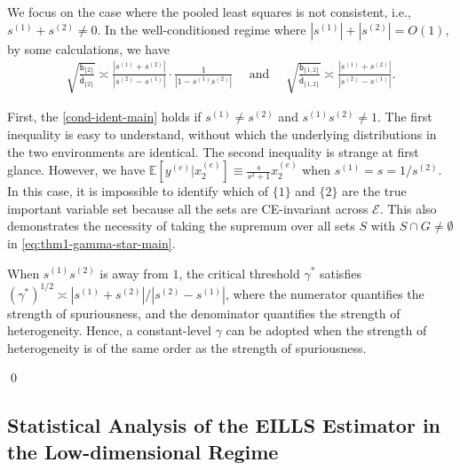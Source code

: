 \documentclass[10pt]{article}
\numberwithin{equation}{section}
\begin{document}
{\begin{example}
{\normalfont We focus on the case where the pooled least squares is not consistent, i.e., $s^{(1)} + s^{(2)} \neq 0$. In the well-conditioned regime where $|s^{(1)}| + |s^{(2)}| = O(1)$, by some calculations, we have
    \begin{align*}
        \sqrt{\frac{\mathsf{b}_{\{2\}}}{\bar{\mathsf{d}}_{\{2\}}}} \asymp \frac{|s^{(1)}+s^{(2)}|}{|s^{(2)} - s^{(1)}|} \cdot \frac{1}{|1 - s^{(1)} s^{(2)}|}~~~~~~\text{and}~~~~~~\sqrt{\frac{\mathsf{b}_{\{1,2\}}}{\bar{\mathsf{d}}_{\{1,2\}}}} \asymp \frac{|s^{(1)} + s^{(2)}|}{|s^{(2)} - s^{(1)}|}.
    \end{align*}

First, the \cref{cond-ident-main} holds if $s^{(1)}\neq s^{(2)}$ and $s^{(1)} s^{(2)} \neq 1$. The first inequality is easy to understand, without which the underlying distributions in the two environments are identical. The second inequality is strange at first glance. However, we have $\mathbb{E}[y^{(e)}|x_2^{(e)}] \equiv \frac{s}{s^2+1} x_2^{(e)}$ when $s^{(1)} = s = 1/s^{(2)}$. In this case, it is impossible to identify which of $\{1\}$ and $\{2\}$ are the true important variable set because all the sets are CE-invariant across $\mathcal{E}$. This also demonstrates the necessity of taking the supremum over all sets $S$ with $S\cap G \neq \emptyset$ in \eqref{eq:thm1-gamma-star-main}.

When $s^{(1)} s^{(2)}$ is away from $1$, the critical threshold $\gamma^*$ satisfies $(\gamma^*)^{1/2}\asymp |s^{(1)}+s^{(2)}|/|s^{(2)}-s^{(1)}|$, where the numerator quantifies the strength of spuriousness, and the denominator quantifies the strength of heterogeneity. Hence, a constant-level $\gamma$ can be adopted when the strength of heterogeneity is of the same order as the strength of spuriousness.
}\qed
\end{example}


\subsection{Statistical Analysis of the EILLS Estimator in the Low-dimensional Regime}
\label{subsec:theory-low-dim}

}
\end{document}

